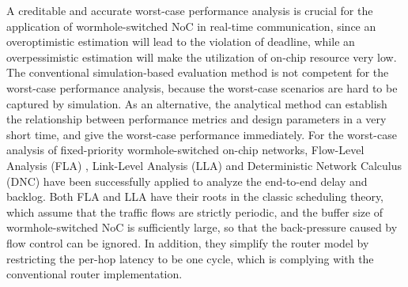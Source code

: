\documentclass[10pt,journal]{IEEEtran}
\begin{document}
A creditable and accurate worst-case performance analysis is crucial for the application of wormhole-switched NoC in real-time communication, since an overoptimistic estimation will lead to the violation of deadline, while an overpessimistic estimation will make the utilization of on-chip resource very low. The conventional simulation-based evaluation method is not competent for the worst-case performance analysis, because the worst-case scenarios are hard to be captured by simulation. As an alternative, the analytical method can establish the relationship between performance metrics and design parameters in a very short time, and give the worst-case performance immediately. For the worst-case analysis of fixed-priority wormhole-switched on-chip networks, Flow-Level Analysis (FLA) \cite{Shi:2008:RCA:1397757.1397996}, Link-Level Analysis (LLA) \cite{73}\cite{189} and Deterministic Network Calculus (DNC) \cite{Qian489900} have been successfully applied to analyze the end-to-end delay and backlog. Both FLA and LLA have their roots in the classic scheduling theory, which assume that the traffic flows are strictly periodic, and the buffer size of wormhole-switched NoC is sufficiently large, so that the back-pressure caused by flow control can be ignored. In addition, they simplify the router model by restricting the per-hop latency to be one cycle, which is complying with the conventional router implementation.
\end{document}
